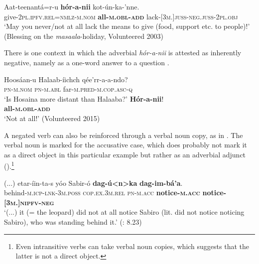 \documentclass[output=paper,colorlinks,citecolor=brown,draftmode
]{langscibook}
\begin{document}

\ea\label{ex:treis:48} 
\gll Aat-teenantá=r-u 						\textbf{hór-a-nii} 			kot-ún-ka-’nne.\\
give-\textsc{2pl.ipfv.rel=nmlz-m.nom} \textbf{all-\textsc{m.obl-add}}	lack-\textsc{[3m.]juss-neg.juss-2pl.obj}\\
\glt ‘May you never/not at all lack the means to give (food, support etc. to people)!’ (Blessing on the \textit{masaala}-holiday, Volunteered 2003)
\z 

There is one context in which the adverbial \textit{hór-a-nii} is attested as inherently negative, namely as a one-word answer to a question .



\ea\label{ex:treis:49} 
    \begin{xlist}[B: ]
    \label{ex:treis:49a}
        \gll  Hoosáan-u	Halaab-íichch	  qée’rr-a-a-ndo? \\
              \textsc{pn-m.nom}	\textsc{pn-m.abl}	far-\textsc{m.pred-m.cop.asc-q}\\	
        \glt ‘Is Hosaina more distant than Halaaba?’
    \label{ex:treis:49b}
        \gll \textbf{Hór-a-nii}!\\
             \textbf{all-\textsc{m.obl-add}}\\
        \glt ‘Not at all!’ (Volunteered 2015)
    \end{xlist}
\z 


A negated verb can also be reinforced through a verbal noun copy, as in . The verbal noun is marked for the accusative case, which does probably not mark it as a direct object in this particular example but rather as an adverbial adjunct ().\footnote{Even intransitive verbs can take verbal noun copies, which suggests that the latter is not a direct object.} 

\ea\label{ex:treis:49add} 
\gll (...) etar-íin-ta-s yóo Sabir-ó \textbf{dag-ú<n>ka} \textbf{dag-im-bá'a}.\\
{} behind-\textsc{m.icp-lnk-3m.poss} \textsc{cop.ex.3m.rel} \textsc{pn-m.acc} \textbf{notice-\textsc{m.acc}}	\textbf{notice-\textsc{[3m.]nipfv-neg}}\\
\glt ‘(...) it (= the leopard) did not at all notice Sabiro (lit. did not notice noticing Sabiro), who was standing behind it.’ (\cite{KEB1989}{:} 8.23)
\z 
\end{document}
